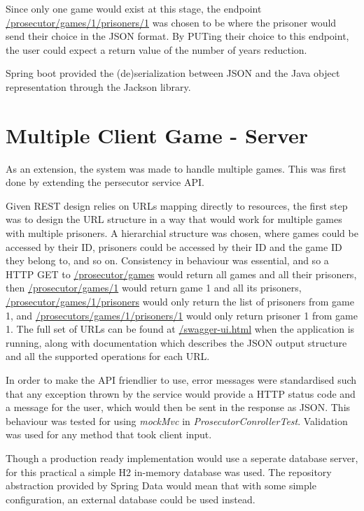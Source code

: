 \documentclass[12pt]{article}
\begin{document}
Since only one game would exist at this stage, the endpoint \url{/prosecutor/games/1/prisoners/1} was chosen to be where the prisoner would send their choice in the JSON format. By PUTing their choice to this endpoint, the user could expect a return value of the number of years reduction. 
 		
Spring boot provided the (de)serialization between JSON and the Java object representation through the Jackson library. 

\part{Multiple Client Game - Server}

As an extension, the system was made to handle multiple games. This was first done by extending the persecutor service API.

Given REST design relies on URLs mapping directly to resources, the first step was to design the URL structure in a way that would work for multiple games with multiple prisoners. A hierarchial structure was chosen, where games could be accessed by their ID, prisoners could be accessed by their ID and the game ID they belong to, and so on. Consistency in behaviour was essential, and so a HTTP GET to \url{/prosecutor/games} would return all games and all their prisoners, then \url{/prosecutor/games/1} would return game 1 and all its prisoners, \url{/prosecutor/games/1/prisoners} would only return the list of prisoners from game 1, and \url{/prosecutors/games/1/prisoners/1} would only return prisoner 1 from game 1. The full set of URLs can be found at \url{/swagger-ui.html} when the application is running, along with documentation which describes the JSON output structure and all the supported operations for each URL.

In order to make the API friendlier to use, error messages were standardised such that any exception thrown by the service would provide a HTTP status code and a message for the user, which would then be sent in the response as JSON. This behaviour was tested for using \emph{mockMvc} in \emph{ProsecutorConrollerTest}. Validation was used for any method that took client input.

Though a production ready implementation would use a seperate database server, for this practical a simple H2 in-memory database was used. The repository abstraction provided by Spring Data would mean that with some simple configuration, an external database could be used instead. 
\end{document}
